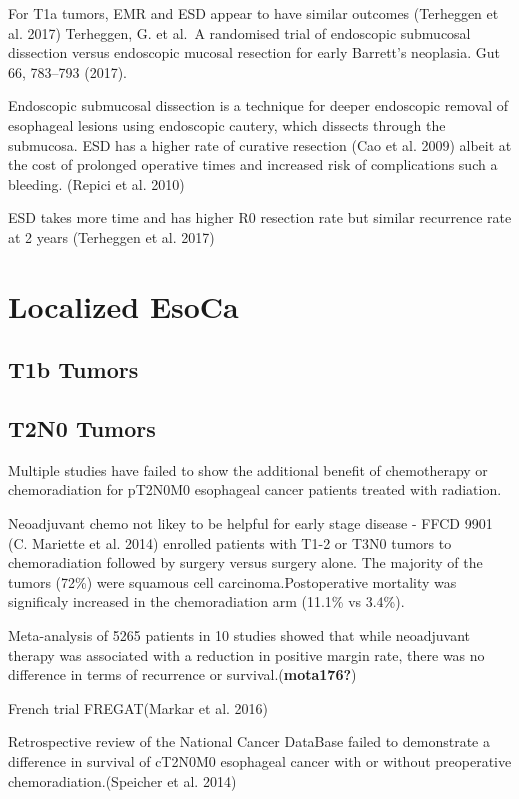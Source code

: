 \documentclass[
  letterpaper,
]{scrbook}
\begin{document}
For T1a tumors, EMR and ESD appear to have similar outcomes (Terheggen
et al. 2017) Terheggen, G. et al.~A randomised trial of endoscopic
submucosal dissection versus endoscopic mucosal resection for early
Barrett's neoplasia. Gut 66, 783--793 (2017).

Endoscopic submucosal dissection is a technique for deeper endoscopic
removal of esophageal lesions using endoscopic cautery, which dissects
through the submucosa. ESD has a higher rate of curative resection (Cao
et al. 2009) albeit at the cost of prolonged operative times and
increased risk of complications such a bleeding. (Repici et al. 2010)

ESD takes more time and has higher R0 resection rate but similar
recurrence rate at 2 years (Terheggen et al. 2017)

\chapter{Localized EsoCa}\label{localized}

\section{T1b Tumors}\label{t1b-tumors}

\section{T2N0 Tumors}\label{t2n0-tumors}

Multiple studies have failed to show the additional benefit of
chemotherapy or chemoradiation for pT2N0M0 esophageal cancer patients
treated with radiation.

Neoadjuvant chemo not likey to be helpful for early stage disease - FFCD
9901 (C. Mariette et al. 2014) enrolled patients with T1-2 or T3N0
tumors to chemoradiation followed by surgery versus surgery alone. The
majority of the tumors (72\%) were squamous cell carcinoma.Postoperative
mortality was significaly increased in the chemoradiation arm (11.1\% vs
3.4\%).

Meta-analysis of 5265 patients in 10 studies showed that while
neoadjuvant therapy was associated with a reduction in positive margin
rate, there was no difference in terms of recurrence or
survival.(\textbf{mota176?})

French trial FREGAT(Markar et al. 2016)

Retrospective review of the National Cancer DataBase failed to
demonstrate a difference in survival of cT2N0M0 esophageal cancer with
or without preoperative chemoradiation.(Speicher et al. 2014)
\end{document}
